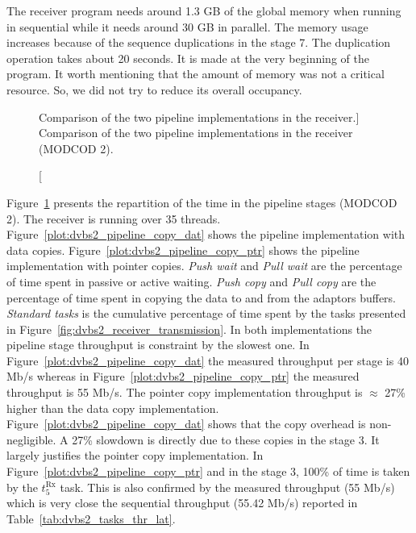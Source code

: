 The receiver program needs around 1.3 GB of the global memory when running in
sequential while it needs around 30 GB in parallel. The memory usage increases
because of the sequence duplications in the stage 7. The duplication operation
takes about 20 seconds. It is made at the very beginning of the program. It
worth mentioning that the amount of memory was not a critical resource. So, we
did not try to reduce its overall occupancy.

\begin{figure}[htp]
  \centering
  \quad
  \caption
    [Comparison of the two pipeline implementations in the receiver.]
    {Comparison of the two pipeline implementations in the receiver (MODCOD 2).}
  \label{plot:dvbs2_pipeline}
\end{figure}

Figure~\ref{plot:dvbs2_pipeline} presents the repartition of the time in the
pipeline stages (MODCOD 2). The receiver is running over 35 threads.
Figure~\ref{plot:dvbs2_pipeline_copy_dat} shows the pipeline implementation with
data copies. Figure~\ref{plot:dvbs2_pipeline_copy_ptr} shows the pipeline
implementation with pointer copies. \emph{Push wait} and \emph{Pull wait} are
the percentage of time spent in passive or active waiting. \emph{Push copy} and
\emph{Pull copy} are the percentage of time spent in copying the data to and
from the adaptors buffers. \emph{Standard tasks} is the cumulative percentage of
time spent by the tasks presented in
Figure~\ref{fig:dvbs2_receiver_transmission}. In both implementations the
pipeline stage throughput is constraint by the slowest one. In
Figure~\ref{plot:dvbs2_pipeline_copy_dat} the measured throughput per stage is
40 Mb/s whereas in Figure~\ref{plot:dvbs2_pipeline_copy_ptr} the
measured throughput is 55 Mb/s. The pointer copy implementation throughput is
$\approx$ 27\% higher than the data copy implementation.
Figure~\ref{plot:dvbs2_pipeline_copy_dat} shows that the copy overhead is
non-negligible. A 27\% slowdown is directly due to these copies in the stage 3.
It largely justifies the pointer copy implementation. In
Figure~\ref{plot:dvbs2_pipeline_copy_ptr} and in the stage 3, 100\% of time is
taken by the $t^\text{Rx}_{5}$ task. This is also confirmed by the measured
throughput (55 Mb/s) which is very close the sequential throughput (55.42
Mb/s) reported in Table~\ref{tab:dvbs2_tasks_thr_lat}.

